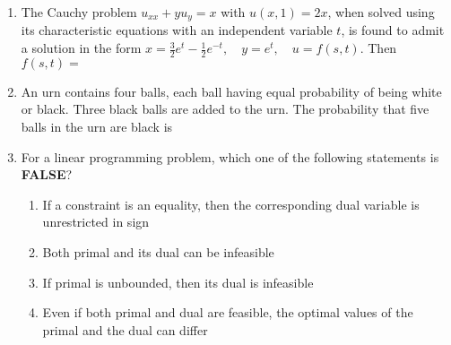 \documentclass[journal,,12pt,onecolumn]{IEEEtran}
\theoremstyle{remark}
\begin{document}
\begin{enumerate}
\item The Cauchy problem $ u_{xx} + y u_y = x $ with $ u(x, 1) = 2x $, when solved using its characteristic equations with an independent variable $ t $, is found to admit a solution in the form
$
x = \frac{3}{2} e^t - \frac{1}{2} e^{-t}, \quad y = e^t, \quad u = f(s, t).
$
Then $ f(s, t) = $
\begin{enumerate}
\end{enumerate}
\bigskip
\item An urn contains four balls, each ball having equal probability of being white or black. Three black balls are added to the urn. The probability that five balls in the urn are black is
\begin{enumerate}
\end{enumerate}
\bigskip
\item For a linear programming problem, which one of the following statements is \textbf{FALSE}?
\begin{enumerate}
    \item If a constraint is an equality, then the corresponding dual variable is unrestricted in sign
    \item Both primal and its dual can be infeasible
    \item If primal is unbounded, then its dual is infeasible
    \item Even if both primal and dual are feasible, the optimal values of the primal and the dual can differ
\end{enumerate}

\bigskip


\end{enumerate}
\end{document}
